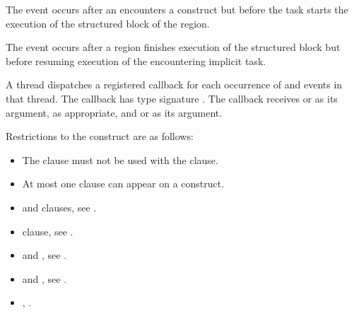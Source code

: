 \events

The  event occurs after an  encounters a
 construct but before the task starts the execution of the structured
block of the  region.

The  event occurs after a  region finishes execution of the structured block
but before resuming execution of the encountering implicit task.


\tools

A thread dispatches a registered 
callback for each occurrence of  and
 events in that thread. The callback has type signature
. The callback receives
 or 
as its  argument, as appropriate, and
 or 
as its  argument.

\restrictions
Restrictions to the  construct are as follows:

\begin{itemize}
\item The  clause must not be used with the  clause.

\item At most one  clause can appear on a  construct.

\end{itemize}


\crossreferences
\begin{itemize}
\item {} and  clauses, see
.

\item {} clause, see
.

\item {} and , see
  .

\item {} and , see
.

\item {},
.

\end{itemize}












